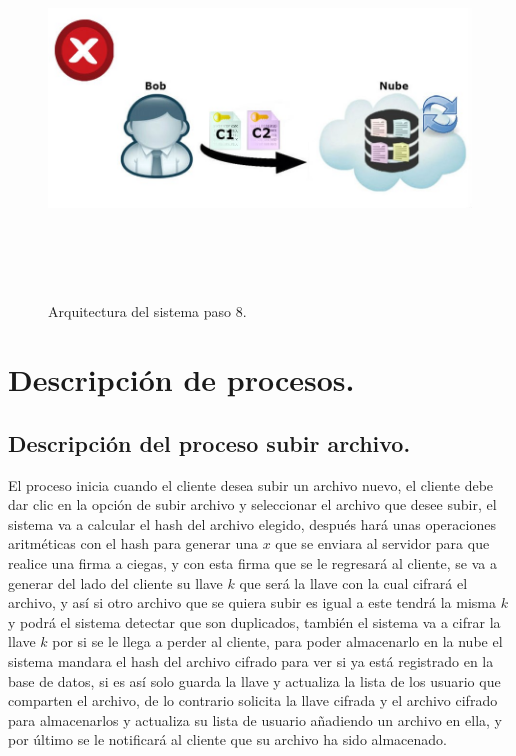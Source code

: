 \begin{figure}[H]
\centering
\includegraphics[width=16cm, height=10cm]{./images/Paso07.jpg}
\caption{Arquitectura del sistema paso 8.}

\end{figure}

\section{Descripción de procesos. }

\subsection{Descripción del proceso subir archivo.}

El proceso inicia cuando el cliente desea subir un archivo nuevo, el cliente debe dar clic en la opción de subir archivo y seleccionar el archivo que desee subir, el sistema va a calcular el hash del archivo elegido, después hará unas operaciones aritméticas con el hash para generar una $x$ que se enviara al servidor para que realice una firma a ciegas, y con esta firma que se le regresará al cliente, se va a generar del lado del cliente su llave $k$ que será la llave con la cual cifrará el archivo, y así si otro archivo que se quiera subir es igual a este tendrá la misma $k$ y podrá el sistema detectar que son duplicados, también el sistema va a cifrar la llave $k$ por si se le llega a perder al cliente, para poder almacenarlo en la nube el sistema mandara el hash del archivo cifrado para ver si ya está registrado en la base de datos, si es así solo guarda la llave y actualiza la lista de los usuario que comparten el archivo, de lo contrario solicita la llave cifrada y el archivo cifrado para almacenarlos y actualiza su lista de usuario añadiendo un archivo en ella, y por último se le notificará al cliente que su archivo ha sido almacenado.



